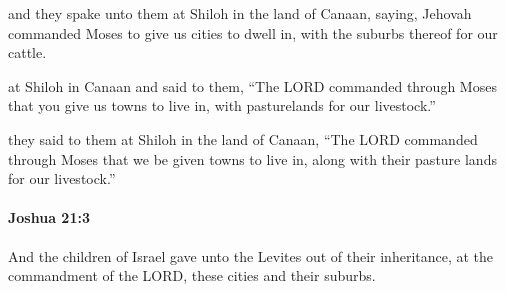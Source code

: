 			\begin{versebox}
					\item[BHS] 
					\item[ASV] and they spake unto them at Shiloh in the land of Canaan, saying, Jehovah commanded Moses to give us cities to dwell in, with the suburbs thereof for our cattle.
					\item[NIV] at Shiloh in Canaan and said to them, “The LORD commanded through Moses that you give us towns to live in, with pasturelands for our livestock.”
					\item[NRSV] they said to them at Shiloh in the land of Canaan, “The LORD commanded through Moses that we be given towns to live in, along with their pasture lands for our livestock.”
			\end{versebox}

		\paragraph{Joshua 21:3} %
			\label{JOSHUA-21-3}

			And the children of Israel gave unto the Levites out of their inheritance, at the commandment of the LORD, these cities and their suburbs.

